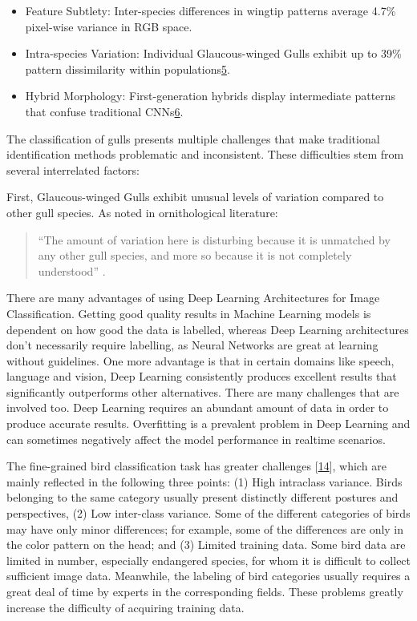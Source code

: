 \documentclass[a4paper,12pt]{article}
\begin{document}
\begin{itemize}
\item Feature Subtlety: Inter-species differences in wingtip patterns average 4.7\% pixel-wise variance in RGB space.


\item Intra-species Variation: Individual Glaucous-winged Gulls exhibit up to 39\% pattern dissimilarity within populations\href{https://www.semanticscholar.org/paper/b995f43e5bcacd8194ae1c534acad3f503076f6e}{5}.


\item Hybrid Morphology: First-generation hybrids display intermediate patterns that confuse traditional CNNs\href{https://www.citewrite.qut.edu.au/write/writing-well/report.html}{6}.

\end{itemize}

The classification of gulls presents multiple challenges that make traditional identification methods problematic and inconsistent. These difficulties stem from several interrelated factors:

First, Glaucous-winged Gulls exhibit unusual levels of variation compared to other gull species. As noted in ornithological literature:

\begin{quote}
    ``The amount of variation here is disturbing because it is unmatched by any other gull species, and more so because it is not completely understood'' \citep{adriaens2022gulls}.
\end{quote}


There are many advantages of using Deep Learning
Architectures for Image Classification. Getting good quality
results in Machine Learning models is dependent on how good
the data is labelled, whereas Deep Learning architectures don’t
necessarily require labelling, as Neural Networks are great at
learning without guidelines. One more advantage is that in
certain domains like speech, language and vision, Deep
Learning consistently produces excellent results that
significantly outperforms other alternatives. There are many
challenges that are involved too. Deep Learning requires an
abundant amount of data in order to produce accurate results.
Overfitting is a prevalent problem in Deep Learning and can
sometimes negatively affect the model performance in realtime scenarios.

The fine-grained bird classification task has greater challenges [\href{https://www.mdpi.com/2076-2615/13/2/264#B14-animals-13-00264}{14}], which are mainly reflected in the following three points: (1) High intraclass variance. Birds belonging to the same category usually present distinctly different postures and perspectives, (2) Low inter-class variance. Some of the different categories of birds may have only minor differences; for example, some of the differences are only in the color pattern on the head; and (3) Limited training data. Some bird data are limited in number, especially endangered species, for whom it is difficult to collect sufficient image data. Meanwhile, the labeling of bird categories usually requires a great deal of time by experts in the corresponding fields. These problems greatly increase the difficulty of acquiring training data.
\end{document}

